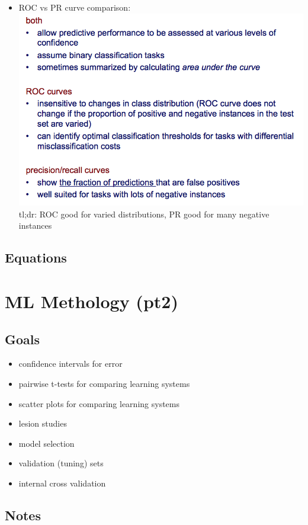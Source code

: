 \documentclass[a4paper]{article}
\begin{document}
\begin{itemize}
\begin{itemize}
  \item ROC vs PR curve comparison: \\
    \includegraphics[scale=0.75]{compare} \\
    tl;dr: ROC good for varied distributions, PR good for many
    negative instances
  \end{itemize}
\end{itemize}

\subsection{Equations}

\section{ML Methology (pt2)}
\subsection{Goals}
\begin{itemize}
\item confidence intervals for error
\item pairwise t-tests for comparing learning systems
\item scatter plots for comparing learning systems
\item lesion studies
\item model selection
\item validation (tuning) sets
\item internal cross validation
\end{itemize}

\subsection{Notes}
\end{document}
